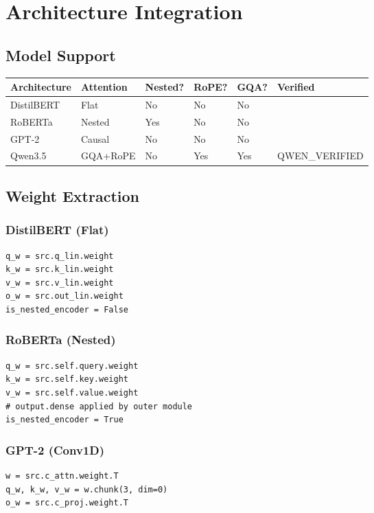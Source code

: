 \section{Architecture Integration}

\subsection{Model Support}

\begin{table}[H]
\centering
\small
\begin{tabular}{llllll}
\toprule
\textbf{Architecture} & \textbf{Attention} & \textbf{Nested?} & \textbf{RoPE?} & \textbf{GQA?} & \textbf{Verified} \\
\midrule
DistilBERT & Flat & No & No & No &  \\
RoBERTa & Nested & Yes & No & No &  \\
GPT-2 & Causal & No & No & No &  \\
Qwen3.5 & GQA+RoPE & No & Yes & Yes & {{QWEN\_VERIFIED}} \\
\bottomrule
\end{tabular}
\end{table}

\subsection{Weight Extraction}

\subsubsection{DistilBERT (Flat)}
\begin{lstlisting}
q_w = src.q_lin.weight
k_w = src.k_lin.weight
v_w = src.v_lin.weight
o_w = src.out_lin.weight
is_nested_encoder = False
\end{lstlisting}

\subsubsection{RoBERTa (Nested)}
\begin{lstlisting}
q_w = src.self.query.weight
k_w = src.self.key.weight
v_w = src.self.value.weight
# output.dense applied by outer module
is_nested_encoder = True
\end{lstlisting}

\subsubsection{GPT-2 (Conv1D)}
\begin{lstlisting}
w = src.c_attn.weight.T
q_w, k_w, v_w = w.chunk(3, dim=0)
o_w = src.c_proj.weight.T
\end{lstlisting}


